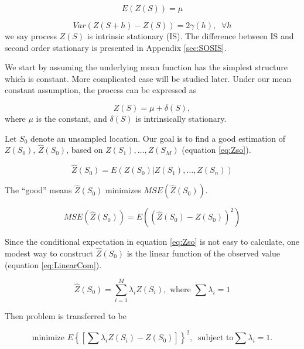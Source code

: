 \documentclass{article}\usepackage[]{graphicx}\usepackage[]{color}
\begin{document}
\begin{equation}
E(Z(S))=\mu
\end{equation}

\begin{equation}
Var(Z(S+h)-Z(S)) = 2\gamma(h),\;\;\forall h
\end{equation}
we say process $Z(S)$ is intrinsic stationary (IS). The difference between IS and second order stationary is presented in Appendix \ref{sec:SOSIS}.

We start by  assuming the underlying mean function has the simplest structure which is constant. More complicated case will be studied later.  Under our mean constant assumption, the process can be expressed as

\begin{equation}
Z(S) = \mu + \delta(S),
\end{equation}
where $\mu$ is the constant, and $\delta(S)$ is intrinsically stationary.

Let $S_0$ denote an unsampled location. Our goal is to find a good estimation of $Z(S_0)$, $\widehat{Z}(S_0)$, based on $Z(S_1),\dots, Z(S_M)$ (equation \ref{eq:Zso}). 

\begin{equation}\label{eq:Zso}
\widehat{Z}(S_0) = E(Z(S_0)|Z(S_1),\dots,Z(S_n))
\end{equation}

The ``good'' means $\widehat{Z}(S_0)$ minimizes $MSE(\widehat{Z}(S_0))$.

\begin{equation}\label{eq:MSE}
MSE(\widehat{Z}(S_0)) = E((\widehat{Z}(S_0)-Z(S_0))^2)
\end{equation}


Since the conditional expectation in equation \ref{eq:Zso}  is not easy to calculate, one modest way to construct $\widehat{Z}(S_0)$ is the  linear function of the observed value (equation \ref{eq:LinearCom}).

\begin{equation}\label{eq:LinearCom}
\widehat{Z}(S_0) = \sum_{i=1}^M\lambda_i Z(S_i),\,\,\textrm{where }\sum\lambda_i=1
\end{equation}

Then problem is transferred to be 

\begin{equation}
\textrm{minimize } E\left\{\left[\sum\lambda_iZ(S_i)-Z(S_0)\right]\right\}^2,\;\; \textrm{subject to}\sum\lambda_i=1.
\end{equation}
\end{document}
